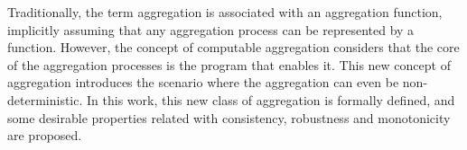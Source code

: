 

Traditionally, the term aggregation is associated with an aggregation function, implicitly assuming that any aggregation process can be represented by a function. However, the concept of computable aggregation considers that the core of the aggregation processes is the program that enables it. This new concept of aggregation introduces the scenario where the aggregation can even be non-deterministic. In this work, this new class of aggregation is formally defined, and some desirable properties related with consistency, robustness and monotonicity are proposed.  


